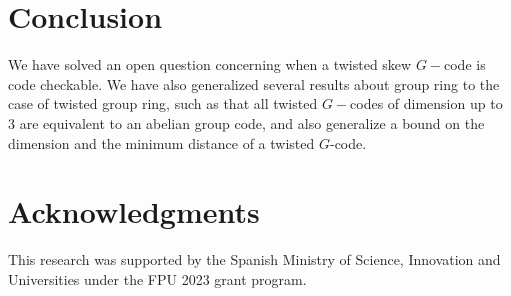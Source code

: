 \documentclass{article}
\begin{document}
\section{Conclusion}
We have solved an open question concerning when a  twisted skew $G-$code is code checkable. We have also generalized several results about group ring to the case of twisted group ring, such as that all twisted $G-$codes of dimension up to 3 are equivalent to an abelian group code, and also generalize a bound on the dimension and the minimum distance of a twisted $G$-code.


\section{Acknowledgments}
This research was supported by the Spanish Ministry of Science, Innovation and Universities under the FPU 2023 grant program.



\end{document}
